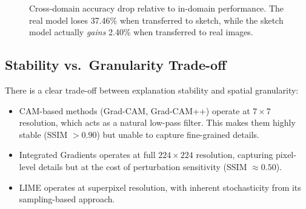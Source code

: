 \documentclass[12pt, a4paper]{article}
\begin{document}
\begin{figure}[H]
\centering
{}
\caption{Cross-domain accuracy drop relative to in-domain performance.  The
real model loses 37.46\% when transferred to sketch, while the sketch model
actually \emph{gains} 2.40\% when transferred to real images.}
\label{fig:domain_drop}
\end{figure}

\subsection{Stability vs.\ Granularity Trade-off}

There is a clear trade-off between explanation stability and spatial
granularity:

\begin{itemize}[leftmargin=*]
    \item CAM-based methods (Grad-CAM, Grad-CAM++) operate at $7 \times 7$
          resolution, which acts as a natural low-pass filter.  This makes them
          highly stable (SSIM $> 0.90$) but unable to capture fine-grained
          details.
    \item Integrated Gradients operates at full $224 \times 224$ resolution,
          capturing pixel-level details but at the cost of perturbation
          sensitivity (SSIM $\approx 0.50$).
    \item LIME operates at superpixel resolution, with inherent stochasticity
          from its sampling-based approach.
\end{itemize}
\end{document}
